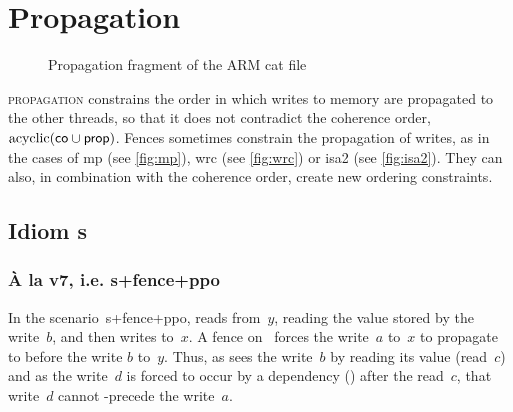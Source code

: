 \documentclass[a4paper]{article}
\begin{document}

\clearpage

\section{Propagation \label{sec:propagation}}

\begin{figure}[!h]

\vspace*{-8mm}
\caption{Propagation fragment of the ARM cat file}
\end{figure}

\textsc{propagation} constrains the order in which writes to memory are
propagated to the other threads, so that it does not contradict the coherence
order, \ie $\operatorname{acyclic}(\mathsf{co} \cup \operatorname{\mathsf{prop}})$. Fences sometimes constrain the
propagation of writes, as in the cases of \textsf{mp} (see \myfig\ref{fig:mp}),
\textsf{wrc} (see \myfig\ref{fig:wrc}) or \textsf{isa2} (see
\myfig\ref{fig:isa2}). They can also, in combination with the coherence order,
create new ordering constraints.

\subsection{Idiom \textsf{s}}

\subsubsection{\`A la v7, i.e. \textsf{s+fence+ppo}}

In the scenario~\textsf{s+fence+ppo},  reads from~$y$, reading the
value stored by the write~$b$, and then writes to~$x$. A fence
on~ forces the write~$a$ to~$x$ to propagate to  before the
write $b$ to~$y$.  Thus, as  sees the write~$b$ by reading its value
(read~$c$) and as the write~$d$ is forced to occur by a dependency (\ppo) after
the read~$c$, that write~$d$ cannot \co-precede the write~$a$.
\end{document}
